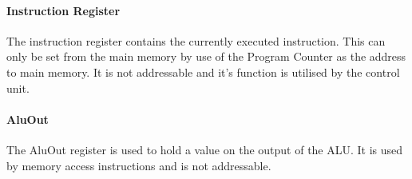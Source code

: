 \paragraph{Instruction Register} 
The instruction register contains the currently executed instruction. 
This can only be set from the main memory by use of the Program Counter as the address to main memory.
It is not addressable and it's function is utilised by the control unit.

\paragraph{AluOut} 
The AluOut register is used to hold a value on the output of the ALU. 
It is used by memory access instructions and is not addressable. 
